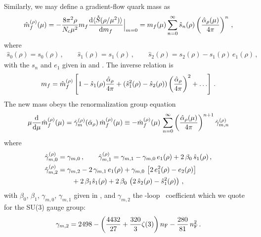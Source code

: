 Similarly, we may define a gradient-flow quark mass as
\begin{equation}
  \begin{split}
    \hat{m}^{(\rho)}_f(\mu) = -\frac{8\pi^2 \rho}{N_\mathrm{c}\mu^2}m_f\frac{{\rm d} \langle
      \mathring{S}(\rho/\mu^2)\rangle}{{\rm d} m_f}\Big|_{m=0} = m_f(\mu)\sum_{n=0}^\infty
    \hat{s}_{n}(\rho)\left(\frac{\hat\alpha_\rho(\mu)}{4\pi}\right)^n\,,
  \end{split}
\end{equation}
where
\begin{equation}
  \begin{split}
    \hat{s}_{0}(\rho) = s_{0}(\rho)\,,\qquad
    \hat{s}_{1}(\rho) = s_{1}(\rho)\,,\qquad
    \hat{s}_{2}(\rho) = s_{2}(\rho) - s_{1}(\rho)\, e_{1}(\rho)\,,
  \end{split}
\end{equation}
with the $s_{n}$ and $e_{1}$ given in  and
. The inverse relation is
\begin{equation}
  \begin{split}
    m_f = \hat{m}^{(\rho)}_f\left[1-\hat{s}_{1}(\rho)\frac{\hat\alpha_\rho}{4\pi} +
      (\hat{s}_{1}^2(\rho)-\hat{s}_{2}(\rho))
      \left(\frac{\hat\alpha_\rho}{4\pi}\right)^2
      + \ldots\right]\,.
  \end{split}
\end{equation}
The new mass obeys the renormalization group equation
\begin{equation}
  \begin{split}
    \mu\frac{{\rm d} }{{\rm d} \mu}\hat{m}^{(\rho)}_f(\mu) = \hat{\gamma}^{(\rho)}_m(\hat\alpha_\rho)\,\hat{m}^{(\rho)}_f(\mu)
   \equiv - \hat{m}^{(\rho)}_f(\mu)\,\sum_{n=0}^\infty
    \left(\frac{\hat\alpha_\rho(\mu)}{4\pi}\right)^{n+1}\hat{\gamma}^{(\rho)}_{m,n}
    \label{eq:rgme}
  \end{split}
\end{equation}
where
\begin{equation}
  \begin{split}
    \hat{\gamma}^{(\rho)}_{m,0} &= \gamma_{m,0}\,,\qquad
    \hat{\gamma}^{(\rho)}_{m,1} = \gamma_{m,1}
    - \gamma_{m,0}\, e_{1}(\rho)
    + 2\,\beta_0\,\hat{s}_{1}(\rho)
    \,,\\
    \hat{\gamma}^{(\rho)}_{m,2} &=
    \gamma_{m,2}
    - 2\,\gamma_{m,1}\,e_{1}(\rho)
    + \gamma_{m,0}\,\left[2\,e_{1}^2(\rho) - e_{2}(\rho)\right]\\&\qquad
    + 2\,\beta_1\hat{s}_{1}(\rho)
    + 2\,\beta_0\,\left(2\,\hat{s}_{2}(\rho)-\hat{s}^2_1(\rho)\right)\,,
  \end{split}
\end{equation}
with $\beta_0$, $\beta_1$, $\gamma_{m,0}$, $\gamma_{m,1}$ given in
, and $\gamma_{m,2}$ the \three-loop \msbar\ coefficient
which we quote for the SU(3) gauge group:
\begin{equation}
  \begin{split}
    \gamma_{m,2} = 2498 -
    \left(\frac{4432}{27}+\frac{320}{3}\zeta(3)\right) n_\mathrm{F} -
    \frac{280}{81}\,n_\mathrm{F}^2\,.
  \end{split}
\end{equation}
